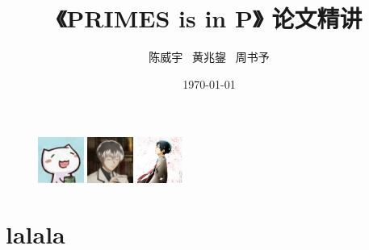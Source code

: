 \documentclass{beamer}
\author{陈威宇 \ 黄兆鋆 \ 周书予}
\title{《\textsf{PRIMES} is in \textbf{P}》 论文精讲}
\institute{信息科学技术学院}
\date{\today}
\begin{document}
\begin{frame}
    \titlepage
    \begin{figure}[htpb]
        \begin{center}
            \includegraphics[width=1.5cm]{cwy.jpg} \qquad
            \includegraphics[width=1.5cm]{hzj.jpg} \qquad
            \includegraphics[width=1.5cm]{zsy.jpg}
        \end{center}
    \end{figure}
\end{frame}

\begin{frame}
    \tableofcontents[sectionstyle=show,subsectionstyle=show/shaded/hide,subsubsectionstyle=show/shaded/hide]
\end{frame}

\section{lalala}
\end{document}
